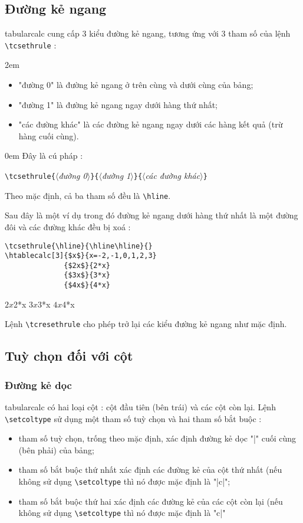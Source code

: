 \documentclass[a4paper,10pt]{article}
\newcommand\argu[1]{$\langle$\textit{#1}$\rangle$}
\newcommand\ARGU[1]{\texttt{\{}\argu{#1}\texttt{\}}}
\newcommand\tbcalc{\textsf{tabularcalc}\xspace}
\newcommand\verbinline{\lstinline[breaklines=false,basicstyle=\normalsize\ttfamily]}
\newcommand\mywidth{0.85\linewidth}
\begin{document}
\subsection{Đường kẻ ngang}
\tbcalc cung cấp 3 kiểu đường kẻ ngang, tương ứng với 3 tham số của lệnh \verbinline|\tcsethrule| :

\parindent2em
\begin{itemize}
	\item "đường 0" là đường kẻ ngang ở trên cùng và dưới cùng của bảng;
	\item "đường 1" là đường kẻ ngang ngay dưới hàng thứ nhất;
	\item "các đường khác" là các đường kẻ ngang ngay dưới các hàng kết quả (trừ hàng cuối cùng).
\end{itemize}\parindent0em
Đây là cú pháp :

\verbinline|\tcsethrule|\ARGU{đường 0}\ARGU{đường 1}\ARGU{các đường khác}
\medskip

Theo mặc định, cả ba tham số đều là \verbinline|\hline|.\medskip

Sau đây là một ví dụ trong đó đường kẻ ngang dưới hàng thứ nhất là một đường đôi và các đường khác đều bị xoá :

\begin{center}
\begin{minipage}{\mywidth}
\begin{lstlisting}
\tcsethrule{\hline}{\hline\hline}{}
\htablecalc[3]{$x$}{x=-2,-1,0,1,2,3}
              {$2x$}{2*x}
              {$3x$}{3*x}
              {$4x$}{4*x}
\end{lstlisting}
\end{minipage}

\tcsethrule{\hline}{\hline\hline}{}
              {$2x$}{2*x}
              {$3x$}{3*x}
              {$4x$}{4*x}
\end{center}

Lệnh \verbinline|\tcresethrule| cho phép trở lại các kiểu đường kẻ ngang như mặc định.

\subsection{Tuỳ chọn đối với cột}
\subsubsection{Đường kẻ dọc}
\tbcalc có hai loại cột : cột đầu tiên (bên trái) và các cột còn lại. Lệnh \verbinline|\setcoltype| sử dụng một tham số tuỳ chọn và hai tham số bắt buộc :
\begin{itemize}
	\item tham số tuỳ chọn, trống theo mặc định, xác định đường kẻ dọc "|" cuối cùng (bên phải) của bảng;
	\item tham số bắt buộc thứ nhất xác định các đường kẻ của cột thứ nhất (nếu không sử dụng \verbinline|\setcoltype| thì nó được mặc định là "|c|";
	\item tham số bắt buộc thứ hai xác định các đường kẻ của các cột còn lại (nếu không sử dụng \verbinline|\setcoltype| thì nó được mặc định là "c|"
\end{itemize}\medskip
\end{document}
